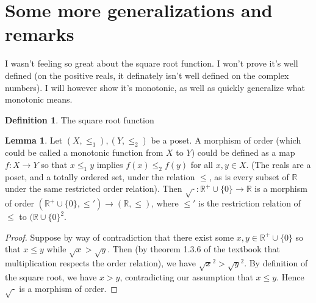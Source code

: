 \documentclass[11pt]{article}
\newcommand{\R}{\mathbb{R}}
\theoremstyle{definition}
\newtheorem*{definition}{Definition}
\newtheorem{lemma}{Lemma}
\begin{document}
\section{Some more generalizations and remarks}

I wasn't feeling so great about the square root function. I won't prove it's well defined (on the positive reals, it definately isn't well defined on the complex numbers). I will however show it's monotonic, as well as quickly generalize what monotonic means. 

\begin{definition}
The square root function 
\end{definition}

\begin{lemma}
Let $(X,\le_1),(Y,\le_2)$ be a poset. A morphism of order (which could be called a monotonic function from $X$ to $Y$) could be defined as a map $f:X\to Y$ so that $x\le_1 y$ implies $f(x)\le_2 f(y)$ for all $x,y \in X$. (The reals are a poset, and a totally ordered set, under the relation $\le$, as is every subset of $\R$ under the same restricted order relation). Then $\sqrt{\cdot}:\R^+\cup \{0\}\to \R$ is a morphism of order $(\R^+\cup \{0\}, \le')\to (\R,\le)$, where $\le'$ is the restriction relation of $\le $ to $(\R\cup \{0\}^2$.
\end{lemma}

\begin{proof}
Suppose by way of contradiction that there exist some $x,y\in \R^+\cup \{0\}$ so that $ x\le y $ while $\sqrt{x} > \sqrt{y}$. Then (by theorem 1.3.6 of the textbook that multiplication respects the order relation), we have $\sqrt{x}^2 > \sqrt{y}^2$. By definition of the square root, we have $x > y$, contradicting our assumption that $x\le y$. Hence $\sqrt{\cdot}$ is a morphism of order. 
\end{proof}
\end{document}
